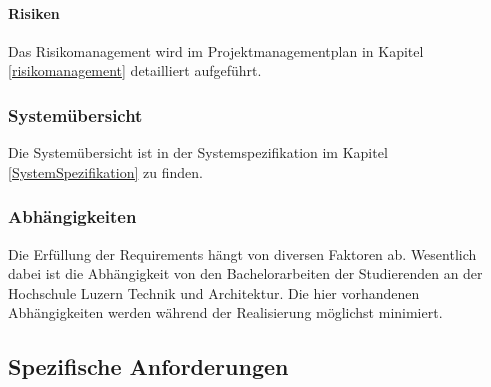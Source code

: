 \paragraph{Risiken}
Das Risikomanagement wird im Projektmanagementplan in Kapitel \ref{risikomanagement} detailliert aufgeführt. 
\subsubsection{Systemübersicht}
Die Systemübersicht ist in der Systemspezifikation im Kapitel \ref{SystemSpezifikation} zu finden. 
\subsubsection{Abhängigkeiten}
Die Erfüllung der Requirements hängt von diversen Faktoren ab. Wesentlich dabei ist die Abhängigkeit von den Bachelorarbeiten der Studierenden an der Hochschule Luzern Technik und Architektur. Die hier vorhandenen Abhängigkeiten werden während der Realisierung möglichst minimiert. 
\subsection{Spezifische Anforderungen}

